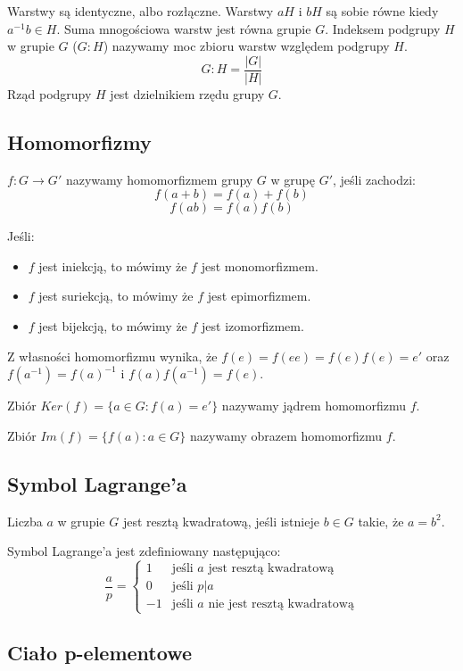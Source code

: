 \documentclass{../notatki}
\begin{document}
Warstwy są identyczne, albo rozłączne. Warstwy $aH$ i $bH$ są sobie
równe kiedy $a^{-1}b \in H$. Suma mnogościowa
warstw jest równa grupie $G$. Indeksem podgrupy $H$ w grupie $G$ ($G
: H$) nazywamy moc zbioru warstw względem podgrupy $H$.
$$
G : H = \frac{|G|}{|H|}
$$
Rząd podgrupy $H$ jest dzielnikiem rzędu grupy $G$.

\subsection{Homomorfizmy}

$f: G \to G'$
nazywamy homomorfizmem grupy $G$ w grupę $G'$, jeśli zachodzi:
$$
f(a + b) = f(a) + f(b)
$$
$$
f(ab) = f(a)f(b)
$$

Jeśli:
\begin{itemize}
  \item $f$ jest iniekcją, to mówimy że $f$ jest monomorfizmem.
  \item $f$ jest suriekcją, to mówimy że $f$ jest epimorfizmem.
  \item $f$ jest bijekcją, to mówimy że $f$ jest izomorfizmem.
\end{itemize}

Z własności homomorfizmu wynika, że $f(e) = f(ee) = f(e)f(e) = e'$
oraz $f(a^{-1}) = f(a)^{-1}$ i $f(a)f(a^{-1}) = f(e)$.

Zbiór $Ker(f) = \{a \in G : f(a) = e'\}$ nazywamy jądrem homomorfizmu $f$.

Zbiór $Im(f) = \{f(a) : a \in G\}$ nazywamy obrazem homomorfizmu $f$.

\subsection{Symbol Lagrange'a}

Liczba $a$ w grupie $G$ jest resztą kwadratową, jeśli istnieje $b \in
G$ takie, że $a = b^2$.

Symbol Lagrange'a jest zdefiniowany następująco:
$$
\frac{a}{p} =
\begin{cases}
  1 & \text{jeśli } a \text{ jest resztą kwadratową} \\
  0 & \text{jeśli } p|a \\
  -1 & \text{jeśli } a \text{ nie jest resztą kwadratową}
\end{cases}
$$

\subsection{Ciało p-elementowe}
\end{document}
